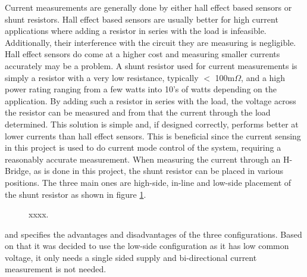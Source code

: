 Current measurements are generally done by either hall effect based sensors or shunt resistors. 
Hall effect based sensors are usually better for high current applications where adding a resistor in series with the load is infeasible. 
Additionally, their interference with the circuit they are measuring is negligible.
Hall effect sensors do come at a higher cost and measuring smaller currents accurately may be a problem.
A shunt resistor used for current measurements is simply a resistor with a very low resistance, typically $<$ 100m$\Omega$, and a high power rating ranging from a few watts into 10's of watts depending on the application.
By adding such a resistor in series with the load, the voltage across the resistor can be measured and from that the current through the load determined.
This solution is simple and, if designed correctly, performs better at lower currents than hall effect sensors.
This is beneficial since the current sensing in this project is used to do current mode control of the system, requiring a reasonably accurate measurement.
When measuring the current through an H-Bridge, as is done in this project, the shunt resistor can be placed in various positions.
The three main ones are high-side, in-line and low-side placement of the shunt resistor as shown in figure \ref{fig:shunt_measure_high_in_low}.

\begin{figure}[h]
	\centering
	\caption{xxxx.}
	\label{fig:shunt_measure_high_in_low}
\end{figure}

\cite{shunt_placement} and \cite{Current_Sense_Circuit_Collection} specifies the advantages and disadvantages of the three configurations.
Based on that it was decided to use the low-side configuration as it has low common voltage, it only needs a single sided supply and bi-directional current measurement is not needed.


